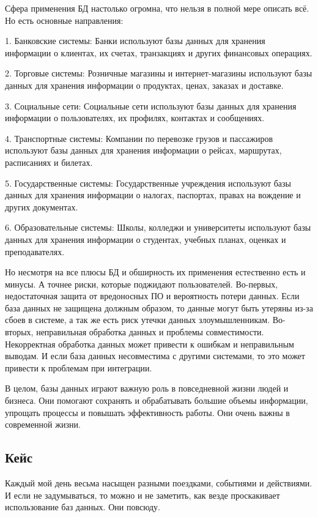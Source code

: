 \documentclass[14pt]{extreport}
\begin{document}
Сфера применения БД настолько огромна, что нельзя в полной мере описать всё. Но есть основные направления:

1. Банковские системы: Банки используют базы данных для хранения
информации о клиентах, их счетах, транзакциях и других финансовых операциях.

2. Торговые системы: Розничные магазины и интернет-магазины используют базы данных для хранения информации о продуктах, ценах, заказах и
доставке.

3. Социальные сети: Социальные сети используют базы данных для хранения информации о пользователях, их профилях, контактах и сообщениях.

4. Транспортные системы: Компании по перевозке грузов и пассажиров
используют базы данных для хранения информации о рейсах, маршрутах,
расписаниях и билетах.

5. Государственные системы: Государственные учреждения используют
базы данных для хранения информации о налогах, паспортах, правах на вождение и других документах.

6. Образовательные системы: Школы, колледжи и университеты используют базы данных для хранения информации о студентах, учебных планах,
оценках и преподавателях.

Но несмотря на все плюсы БД и обширность их применения естественно есть и минусы. А точнее риски, которые поджидают пользователей. Во-первых, недостаточная защита от вредоносных ПО и вероятность потери
данных. Если база данных не защищена должным образом, то данные могут быть утеряны из-за сбоев в системе, а так же есть риск утечки данных
злоумышленникам. Во-вторых, неправильная обработка данных и проблемы
совместимости. Некорректная обработка данных может привести к ошибкам
и неправильным выводам. И если база данных несовместима с другими системами, то это может привести к проблемам при интеграции.

В целом, базы данных играют важную роль в повседневной жизни людей
и бизнеса. Они помогают сохранять и обрабатывать большие объемы информации, упрощать процессы и повышать эффективность работы. Они очень
важны в современной жизни.

\subsection{Кейс}

Каждый мой день весьма насыщен разными поездками, событиями и действиями. И если не задумываться, то можно и не заметить, как везде проскакивает использование баз данных. Они повсюду.
\end{document}
